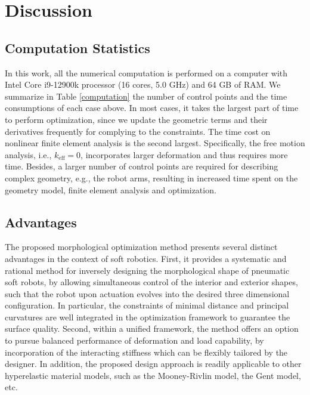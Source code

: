 \documentclass[journal]{IEEEtran}
\theoremstyle{definition}
\begin{document}
\section{Discussion}
\subsection{Computation Statistics}
In this work, all the numerical computation is performed on a computer with Intel Core i9-12900k processor (16 cores, 5.0 GHz) and 64 GB of RAM. We summarize in Table \ref{computation} the number of control points and the time consumptions of each case above. In most cases, it takes the largest part of time to perform optimization, since we update the geometric terms and their derivatives frequently for complying to the constraints. The time cost on nonlinear finite element analysis is the second largest. Specifically, the free motion analysis, i.e., $k_{\text{eff}}=0$, incorporates larger deformation and thus requires more time. Besides, a larger number of control points are required for describing complex geometry, e.g., the robot arms, resulting in increased time spent on the geometry model, finite element analysis and optimization.

\subsection{Advantages}
The proposed morphological optimization method presents several distinct advantages in the context of soft robotics. First, it provides a systematic and rational method for inversely designing the morphological shape of pneumatic soft robots, by allowing simultaneous control of the interior and exterior shapes, such that the robot upon actuation evolves into the desired three dimensional configuration. In particular, the constraints of minimal distance and principal curvatures are well integrated in the optimization framework to guarantee the surface quality. Second, within a unified framework, the method offers an option to pursue balanced performance of deformation and load capability, by incorporation of the interacting stiffness which can be flexibly tailored by the designer. In addition, the proposed design approach is readily applicable to other hyperelastic material models, such as the Mooney-Rivlin model, the Gent model, etc.
\end{document}
